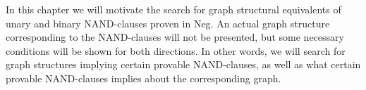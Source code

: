 In this chapter we will motivate the search for graph structural equivalents of unary and binary NAND-clauses proven in Neg.
An actual graph structure corresponding to the NAND-clauses will not be presented, but some necessary conditions will be shown for both directions.
In other words, we will search for graph structures implying certain provable NAND-clauses, as well as what certain provable NAND-clauses implies about the corresponding graph.
